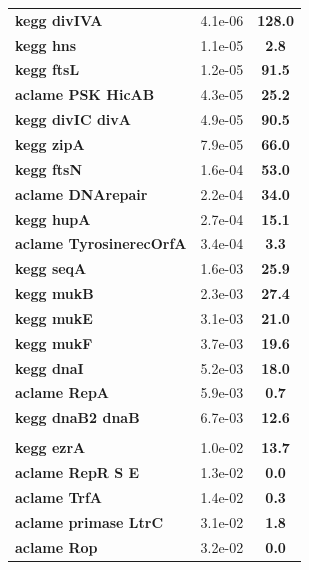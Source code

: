 \begin{landscape}
\begin{table}
{\begin{minipage}[t]{0.3\textwidth}
\begin{tabular}{>{\bfseries}p{\textwidth}cc}
\rowcolor{posit}kegg divIVA&4.1e-06&\textbf{\colorbox{colorpowerxxxx}{128.0}}\\
\rowcolor{posit}kegg hns&1.1e-05&\textbf{\colorbox{colorpowerx}{2.8}}\\
\rowcolor{posit}kegg ftsL&1.2e-05&\textbf{\colorbox{colorpowerxxxx}{91.5}}\\
\rowcolor{posit}aclame PSK HicAB&4.3e-05&\textbf{\colorbox{colorpowerxxx}{25.2}}\\
\rowcolor{posit}kegg divIC divA&4.9e-05&\textbf{\colorbox{colorpowerxxxx}{90.5}}\\
\rowcolor{posit}kegg zipA&7.9e-05&\textbf{\colorbox{colorpowerxxxx}{66.0}}\\
\rowcolor{posit}kegg ftsN&1.6e-04&\textbf{\colorbox{colorpowerxxx}{53.0}}\\
\rowcolor{posit}aclame DNArepair&2.2e-04&\textbf{\colorbox{colorpowerxxx}{34.0}}\\
\rowcolor{posit}kegg hupA&2.7e-04&\textbf{\colorbox{colorpowerxx}{15.1}}\\
\rowcolor{posit}aclame TyrosinerecOrfA&3.4e-04&\textbf{\colorbox{colorpowerx}{3.3}}\\
\rowcolor{posit}kegg seqA&1.6e-03&\textbf{\colorbox{colorpowerxxx}{25.9}}\\
\rowcolor{posit}kegg mukB&2.3e-03&\textbf{\colorbox{colorpowerxxx}{27.4}}\\
\rowcolor{posit}kegg mukE&3.1e-03&\textbf{\colorbox{colorpowerxxx}{21.0}}\\
\rowcolor{posit}kegg mukF&3.7e-03&\textbf{\colorbox{colorpowerxx}{19.6}}\\
\rowcolor{posit}kegg dnaI&5.2e-03&\textbf{\colorbox{colorpowerxx}{18.0}}\\
\rowcolor{posit}aclame RepA&5.9e-03&\textbf{\colorbox{colorpowerneg}{0.7}}\\
\rowcolor{posit}kegg dnaB2 dnaB&6.7e-03&\textbf{\colorbox{colorpowerxx}{12.6}}\\
\\
\rowcolor{posit2}kegg ezrA&1.0e-02&\textbf{\colorbox{colorpowerxx}{13.7}}\\
\rowcolor{posit2}aclame RepR S E&1.3e-02&\textbf{\colorbox{colorpowernegxxx}{0.0}}\\
\rowcolor{posit2}aclame TrfA&1.4e-02&\textbf{\colorbox{colorpowernegx}{0.3}}\\
\rowcolor{posit2}aclame primase LtrC&3.1e-02&\textbf{\colorbox{colorpower}{1.8}}\\
\rowcolor{posit2}aclame Rop&3.2e-02&\textbf{\colorbox{colorpowernegxxxx}{0.0}}\\

\end{tabular}
\end{minipage}}
\end{table}
\end{landscape}
